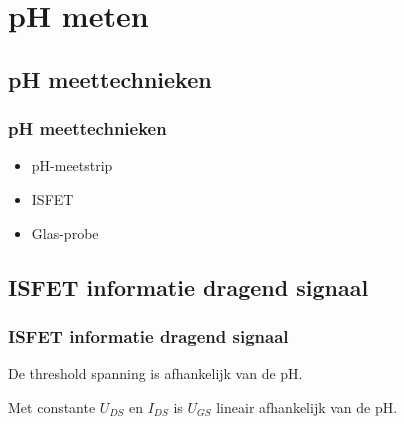 \section{pH meten}
    \subsection*{pH meettechnieken}
    \begin{frame}
        \frametitle{pH meettechnieken}
    
        \begin{itemize}
            \item pH-meetstrip
            \item ISFET
            \item Glas-probe
        \end{itemize}
    
    \end{frame}

    \subsection*{ISFET informatie dragend signaal}
    \begin{frame}
        \frametitle{ISFET informatie dragend signaal}

        De threshold spanning is afhankelijk van de pH.

        Met constante $U_{DS}$ en $I_{DS}$ is $U_{GS}$ lineair afhankelijk van de pH.
    
    
    \end{frame}